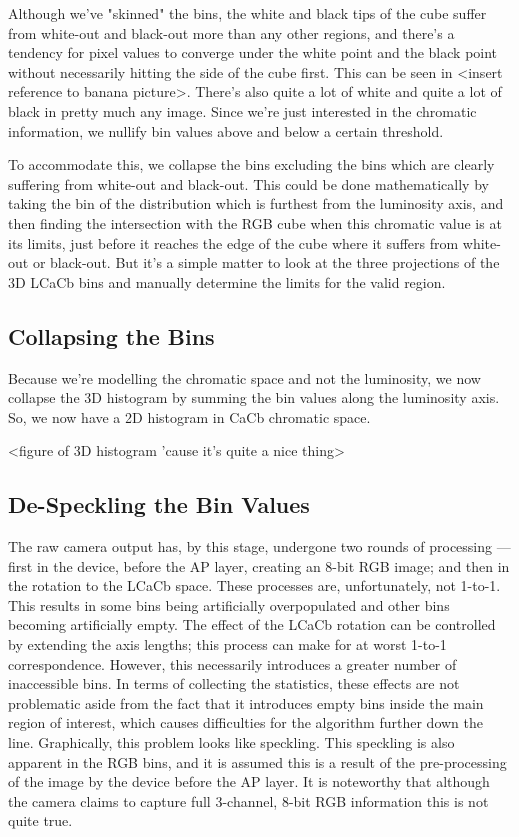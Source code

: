 Although we've "skinned" the bins, the white and black tips of the cube suffer from white-out and black-out more than any other regions, and there's a tendency for pixel values to converge under the white point and the black point without necessarily hitting the side of the cube first. This can be seen in <insert reference to banana picture>. There's also quite a lot of white and quite a lot of black in pretty much any image. Since we're just interested in the chromatic information, we nullify bin values above and below a certain threshold.

To accommodate this, we collapse the bins excluding the bins which are clearly suffering from white-out and black-out. This could be done mathematically by taking the bin of the distribution which is furthest from the luminosity axis, and then finding the intersection with the RGB cube when this chromatic value is at its limits, just before it reaches the edge of the cube where it suffers from white-out or black-out. But it's a simple matter to look at the three projections of the 3D LCaCb bins and manually determine the limits for the valid region.


\subsection{Collapsing the Bins}\label{sec:CollapsingTheBins}
Because we're modelling the chromatic space and not the luminosity, we now collapse the 3D histogram by summing the bin values along the luminosity axis. So, we now have a 2D histogram in CaCb chromatic space.

<figure of 3D histogram 'cause it's quite a nice thing>


\subsection{De-Speckling the Bin Values}\label{sec:DeSpeckle}
The raw camera output has, by this stage, undergone two rounds of processing --- first in the device, before the AP layer, creating an 8-bit RGB image; and then in the rotation to the LCaCb space. These processes are, unfortunately, not 1-to-1. This results in some bins being artificially overpopulated and other bins becoming artificially empty. The effect of the LCaCb rotation can be controlled by extending the axis lengths; this process can make for at worst 1-to-1 correspondence. However, this necessarily introduces a greater number of inaccessible bins. In terms of collecting the statistics, these effects are not problematic aside from the fact that it introduces empty bins inside the main region of interest, which causes difficulties for the algorithm further down the line. Graphically, this problem looks like speckling. This speckling is also apparent in the RGB bins, and it is assumed this is a result of the pre-processing of the image by the device before the AP layer. It is noteworthy that although the camera claims to capture full 3-channel, 8-bit RGB information this is not quite true. 

